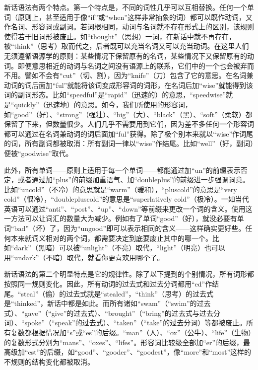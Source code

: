 新话语法有两个特点。第一个特点是，不同的词性几乎可以互相替换。任何一个单词（原则上，甚至适用于像``if''或``when''这样非常抽象的词）都可以既作动词，又作名词、形容词或副词。若词根相同，动词与名词就不存在形式上的区别，该规则使得若干旧词形被废止。如``thought''（思想）一词，在新话中就不再存在，被``think''（思考）取而代之，后者既可以充当名词又可以充当动词。在这里人们无须遵循语源学的原则：某些情况下保留原有的名词，某些情况下又保留原有的动词。即便意思相近的动词与名词之间没有语源上的联系，它们中的一个也会被弃而不用。譬如不会有``cut''（切、割），因为``knife''（刀）包含了它的意思。在名词兼动词的词后面加``ful''就能将该词变成形容词的词形，在名词后加``wise''就能得到该词的副词形态。比如``speedful''是``rapid''（迅速的）的意思，``speedwise''就是``quickly''（迅速地）的意思。如今，我们所使用的形容词，如``good''（好）、``strong''（强壮）、``big''（大）、``black''（黑）、``soft''（柔软）都保留了下来，但数量很少。人们几乎不需要用到它们，因为差不多任何一个形容词都可以通过在名词兼动词的词后面加``ful''获得。除了极个别本来就以``wise''作词尾的词，所有副词都被取消：所有副词一律以``wise''作结尾。比如``well''（好，副词）便被``goodwise''取代。

此外，所有单词——原则上适用于每一个单词——都能通过加``un''的前缀表示否定，或者通过加``plus''的前缀加重语气、加``doubleplus''的前缀进一步强调词意。比如``uncold''（不冷）的意思就是``warm''（暖和），``pluscold''的意思是``very
cold''（很冷），``doublepluscold''的意思是``superlatively
cold''（极冷）。一如当代英语可以通过``anti''、``post''、``up''、``down''等前缀来更改一个词的含义。使用这一方法可以让词汇的数量大为减少。例如有了单词``good''（好），就没必要有单词``bad''（坏）了，因为``ungood''即可以表示相同的含义——这样确实更好些。任何本来就词义相对的两个词，都需要决定到底要废止其中的哪一个。比如``dark''（黑暗）可以被``unlight''（不亮）取代，``light''（明亮）也可以用``undark''（不暗）取代，就看你更喜欢用哪个了。

新话语法的第二个明显特点是它的规律性。除了以下提到的个别情况，所有词形都按照同一规则变化。因此，所有动词的过去式和过去分词都用``ed''作结尾。``steal''（偷）的过去式就是``stealed''，``think''（思考）的过去式是``thinked''，新话中都是如此。而所有诸如``swam''（``swim''的过去式）、``gave''（``give''的过去式）、``brought''（``bring''的过去式与过去分词）、``spoke''（``speak''的过去式）、``taken''（``take''的过去分词）等都被废止。所有复数都根据情况加``s''或``es''的后缀。``man''（人）、``ox''（公牛）、``life''（生物）的复数形式分别为``mans''、``oxes''、``lifes''。形容词比较级全部加``er''的后缀，最高级加``est''的后缀，如``good''、``gooder''、``goodest''，像``more''和``most''这样的不规则的结构变化都被取消。

